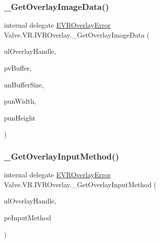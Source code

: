 \mbox{\label{struct_valve_1_1_v_r_1_1_i_v_r_overlay_a871e10fd2136e1cfe17cab1e20aa3832}} 
\subsubsection{\texorpdfstring{\_GetOverlayImageData()}{\_GetOverlayImageData()}}
{\footnotesize\ttfamily internal delegate \mbox{\hyperlink{namespace_valve_1_1_v_r_aaee5c5144f42b7969d45b854f51b0c18}{E\+V\+R\+Overlay\+Error}} Valve.\+V\+R.\+I\+V\+R\+Overlay.\+\_\+\+Get\+Overlay\+Image\+Data (\begin{DoxyParamCaption}\item[{ulong}]{ul\+Overlay\+Handle,  }\item[{Int\+Ptr}]{pv\+Buffer,  }\item[{uint}]{un\+Buffer\+Size,  }\item[{ref uint}]{pun\+Width,  }\item[{ref uint}]{pun\+Height }\end{DoxyParamCaption})}

\mbox{\label{struct_valve_1_1_v_r_1_1_i_v_r_overlay_a0144a0a15ffc7d02c585198bc2cdcc7c}} 
\subsubsection{\texorpdfstring{\_GetOverlayInputMethod()}{\_GetOverlayInputMethod()}}
{\footnotesize\ttfamily internal delegate \mbox{\hyperlink{namespace_valve_1_1_v_r_aaee5c5144f42b7969d45b854f51b0c18}{E\+V\+R\+Overlay\+Error}} Valve.\+V\+R.\+I\+V\+R\+Overlay.\+\_\+\+Get\+Overlay\+Input\+Method (\begin{DoxyParamCaption}\item[{ulong}]{ul\+Overlay\+Handle,  }\item[{ref \mbox{\hyperlink{namespace_valve_1_1_v_r_a43f4e4c6980efb8b0d2a954640203d74}{V\+R\+Overlay\+Input\+Method}}}]{pe\+Input\+Method }\end{DoxyParamCaption})}

